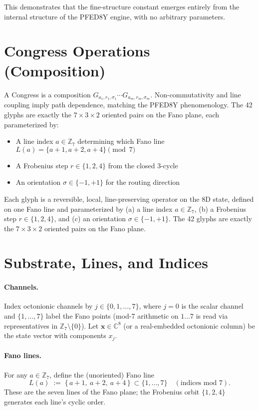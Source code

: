 \documentclass[pdflatex,sn-mathphys-num]{sn-jnl}
\theoremstyle{thmstyleone}
\theoremstyle{thmstyletwo}
\theoremstyle{thmstylethree}
\begin{document}
This demonstrates that the fine-structure constant emerges entirely from the internal structure of the PFED8Y engine, with no arbitrary parameters.


\section{Congress Operations (Composition)}

A Congress is a composition $G_{a_1,r_1,\sigma_1}\cdots G_{a_m,r_m,\sigma_m}$. Non-commutativity and line coupling imply path dependence, matching the PFED8Y phenomenology. The 42 glyphs are exactly the $7\times3\times2$ oriented pairs on the Fano plane, each parameterized by:
\begin{itemize}
    \item A line index $a\in\mathbb{Z}_7$ determining which Fano line $L(a) = \{a+1, a+2, a+4\} \pmod{7}$
    \item A Frobenius step $r\in\{1,2,4\}$ from the closed 3-cycle
    \item An orientation $\sigma\in\{-1,+1\}$ for the routing direction
\end{itemize}

Each glyph is a reversible, local, line-preserving operator on the 8D state,
defined on one Fano line and parameterized by
(a) a line index \(a\in\mathbb{Z}_7\),
(b) a Frobenius step \(r\in\{1,2,4\}\), and
(c) an orientation \(\sigma\in\{-1,+1\}\).
The 42 glyphs are exactly the \(7\times3\times2\) oriented pairs on the Fano plane.

\section{Substrate, Lines, and Indices}
\paragraph{Channels.}
Index octonionic channels by \(j\in\{0,1,\dots,7\}\), where \(j=0\) is the scalar
channel and \(\{1,\dots,7\}\) label the Fano points (mod-7 arithmetic on \(1\ldots7\)
is read via representatives in \(\mathbb{Z}_7\setminus\{0\}\)).
Let \(\mathbf{x}\in\mathbb{C}^8\) (or a real-embedded octonionic column)
be the state vector with components \(x_j\).

\paragraph{Fano lines.}
For any \(a\in\mathbb{Z}_7\), define the (unoriented) Fano line
\[
L(a) \;:=\; \{\,a+1,\ a+2,\ a+4\,\}\ \subset \{1,\dots,7\}\quad (\text{indices mod }7).
\]
These are the seven lines of the Fano plane; the Frobenius orbit \(\{1,2,4\}\)
generates each line’s cyclic order.
\end{document}
